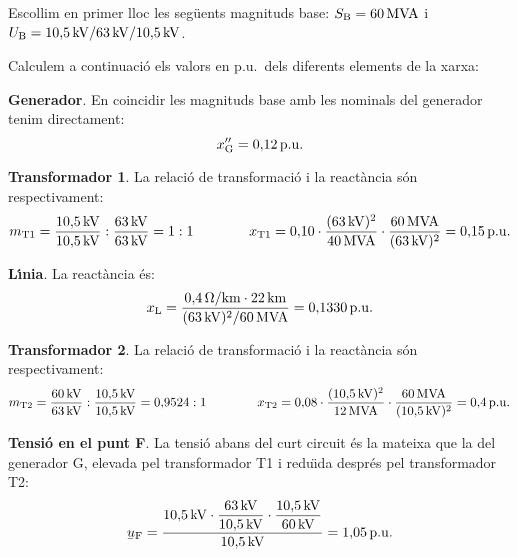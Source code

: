 \begin{exemple}
Escollim en primer lloc les seg\"{u}ents magnituds base: $S_\mathrm{B} = 60\mathrm{\,MVA}$ i $U_\mathrm{B}
= 10{,}5\mathrm{\,kV} / 63\mathrm{\,kV} / 10{,}5\mathrm{\,kV}$.

Calculem a continuaci\'{o} els valors en p.u.\ dels diferents elements de la xarxa:

\textbf{Generador}. En coincidir les magnituds base amb les nominals del generador tenim
 directament:
\[
x''_\mathrm{G} = 0{,}12\mathrm{\,p.u.}
\]

\textbf{Transformador 1}. La relaci\'{o} de transformaci\'{o} i la react\`{a}ncia s\'{o}n respectivament:
\[
m_\mathrm{T1} = \frac{10{,}5\mathrm{\,kV}}{10{,}5\mathrm{\,kV}} :
\frac{63\mathrm{\,kV}}{63\mathrm{\,kV}} = 1:1 \qquad\qquad x_\mathrm{T1} =
0{,}10 \cdot \frac{(63\mathrm{\,kV})^2}{40\mathrm{\,MVA}} \cdot
\frac{60\mathrm{\,MVA}}{(63\mathrm{\,kV})^2}  = 0{,}15\mathrm{\,p.u.}
\]

\textbf{L\'{\i}nia}. La react\`{a}ncia \'{e}s:
\[x_\mathrm{L} = \frac{0{,}4\mathrm{\,\mathrm{\Omega}/km} \cdot 22\mathrm{\,km}} {(63\mathrm{\,kV})^2/60\mathrm{\,MVA}}  = 0{,}1330\mathrm{\,p.u.}
\]

\textbf{Transformador 2}. La relaci\'{o} de transformaci\'{o} i la react\`{a}ncia s\'{o}n respectivament:
\[
m_\mathrm{T2} = \frac{60\mathrm{\,kV}}{63\mathrm{\,kV}} :
\frac{10{,}5\mathrm{\,kV}}{10{,}5\mathrm{\,kV}} = 0{,}9524:1 \qquad\qquad
x_\mathrm{T2} = 0{,}08 \cdot \frac{(10{,}5\mathrm{\,kV})^2}{12\mathrm{\,MVA}}
\cdot \frac{60\mathrm{\,MVA}}{(10{,}5\mathrm{\,kV})^2}  = 0{,}4\mathrm{\,p.u.}
\]

\textbf{Tensi\'{o} en el punt F}. La tensi\'{o} abans del curt circuit \'{e}s la mateixa que la del generador G, elevada pel transformador T1 i redu\"{\i}da despr\'{e}s pel transformador T2:
\[
\cmplx{u}\ped{F} = \frac{10{,}5\unit{kV} \cdot
\dfrac{63\unit{kV}}{10{,}5\unit{kV}} \cdot
\dfrac{10{,}5\unit{kV}}{60\unit{kV}}}{10{,}5\unit{kV}} =
1{,}05\unit{p.u.}
\]


\end{exemple}
